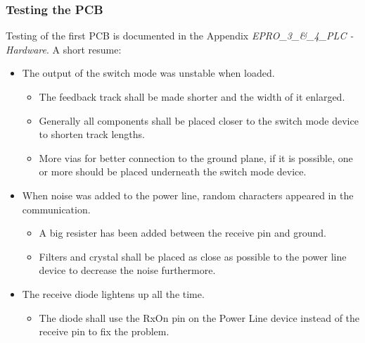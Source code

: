 \subsubsection{Testing the PCB}
Testing of the first PCB is documented in the Appendix \textit{EPRO\_3\_\&\_4\_PLC - Hardware}. A short resume:
\begin{itemize}
	\item The output of the switch mode was unstable when loaded. 
	\begin{itemize}
		\item The feedback track shall be made shorter and the width of it enlarged. 
		\item Generally all components shall be placed closer to the switch mode device to shorten track lengths. 
		\item More vias for better connection to the ground plane, if it is possible, one or more should be placed underneath the switch mode device.
	\end{itemize}
	\item When noise was added to the power line, random characters appeared in the communication.
	\begin{itemize}
		\item A big resister has been added between the receive pin and ground.
		\item Filters and crystal shall be placed as close as possible to the power line device to decrease the noise furthermore.
	\end{itemize} 
	\item The receive diode lightens up all the time.
	\begin{itemize}
		\item The diode shall use the RxOn pin on the Power Line device instead of the receive pin to fix the problem.
	\end{itemize}
\end{itemize}

